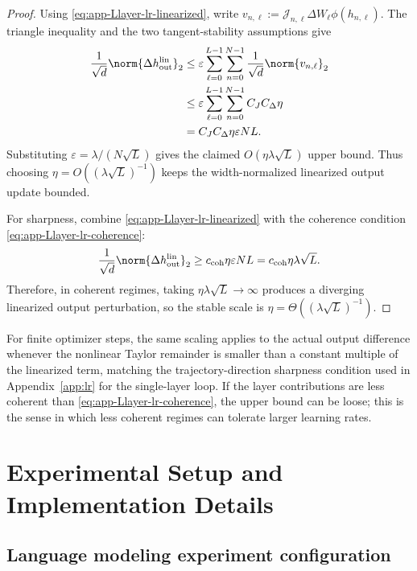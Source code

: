 \begin{proof}
Using \eqref{eq:app-Llayer-lr-linearized}, write $v_{n,\ell}:=\mathcal J_{n,\ell}\Delta W_\ell\phi(h_{n,\ell})$.
The triangle inequality and the two tangent-stability assumptions give
\[
  \begin{aligned}
  \frac{1}{\sqrt d}
  \norm{\Delta h_{\mathrm{out}}^{\mathrm{lin}}}_2
  &\le
  \varepsilon
  \sum_{\ell=0}^{L-1}
  \sum_{n=0}^{N-1}
  \frac{1}{\sqrt d}
  \norm{v_{n,\ell}}_2\\
  &\le
  \varepsilon
  \sum_{\ell=0}^{L-1}
  \sum_{n=0}^{N-1}
  C_JC_\Delta\eta\\
  &=
  C_JC_\Delta\eta\varepsilon NL.
  \end{aligned}
\]
Substituting $\varepsilon=\lambda/(N\sqrt L)$ gives the claimed $O(\eta\lambda\sqrt L)$ upper bound.
Thus choosing $\eta=O((\lambda\sqrt L)^{-1})$ keeps the width-normalized linearized output update bounded.

For sharpness, combine \eqref{eq:app-Llayer-lr-linearized} with the coherence condition \eqref{eq:app-Llayer-lr-coherence}:
\[
  \frac{1}{\sqrt d}
  \norm{\Delta h_{\mathrm{out}}^{\mathrm{lin}}}_2
  \ge
  c_{\mathrm{coh}}\eta\varepsilon NL
  =
  c_{\mathrm{coh}}\eta\lambda\sqrt L.
\]
Therefore, in coherent regimes, taking $\eta\lambda\sqrt L\to\infty$ produces a diverging linearized output perturbation, so the stable scale is $\eta=\Theta((\lambda\sqrt L)^{-1})$.
\end{proof}

For finite optimizer steps, the same scaling applies to the actual output difference whenever the nonlinear Taylor remainder is smaller than a constant multiple of the linearized term, matching the trajectory-direction sharpness condition used in Appendix~\ref{app:lr} for the single-layer loop.
If the layer contributions are less coherent than \eqref{eq:app-Llayer-lr-coherence}, the upper bound can be loose; this is the sense in which less coherent regimes can tolerate larger learning rates.

\section{Experimental Setup and Implementation Details}
\label{app:experimental-details}

\subsection{Language modeling experiment configuration}
\label{app:model-config}

